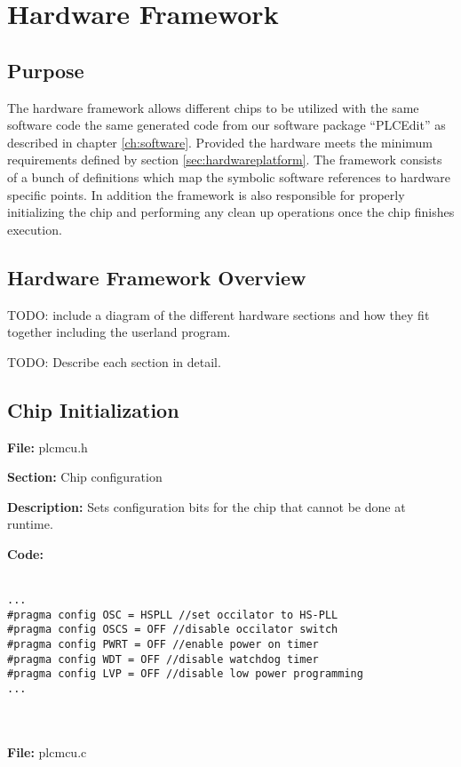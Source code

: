 \section{Hardware Framework}
\label{sec:hardwareframework}

\subsection{Purpose}
The hardware framework allows different chips to be utilized with the same software code the same generated code from our software package ``PLCEdit'' as described in chapter \ref{ch:software}. Provided the hardware meets the minimum requirements defined by section \ref{sec:hardwareplatform}. The framework consists of a bunch of definitions which map the symbolic software references to hardware specific points. In addition the framework is also responsible for properly initializing the chip and performing any clean up operations once the chip finishes execution.


\subsection{Hardware Framework Overview}
TODO: include a diagram of the different hardware sections and how they fit together including the userland program.


TODO: Describe each section in detail.


\subsection{Chip Initialization} 
\textbf{File:} plcmcu.h

\textbf{Section:} Chip configuration 

\textbf{Description:} Sets configuration bits for the chip that cannot be done at runtime.

\textbf{Code:}
\\
\\
\begin{minipage}{\textwidth}
\begin{lstlisting}[frame=single]
...
#pragma config OSC = HSPLL //set occilator to HS-PLL
#pragma config OSCS = OFF //disable occilator switch
#pragma config PWRT = OFF //enable power on timer
#pragma config WDT = OFF //disable watchdog timer
#pragma config LVP = OFF //disable low power programming
...
\end{lstlisting}
\end{minipage}
\\
\\
\textbf{File:} plcmcu.c


